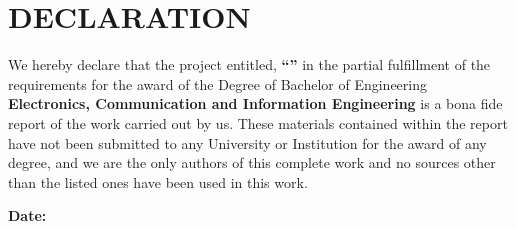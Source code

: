 \chapter*{DECLARATION}
{} %

\noindent We hereby declare that the project entitled, \textbf{``\cTitle''} in the partial fulfillment  of the requirements for the award of the Degree of Bachelor of Engineering \textbf{Electronics, Communication and Information Engineering} is a bona fide report of the work carried out by us. These materials contained within the report have not been submitted to any University or Institution for the award of any degree, and we are the only authors of this complete work and no sources other than the listed ones have been used in this work.
\vspace{0.5cm}

\noindent \authorTable

\noindent \textbf{Date:} \cDate

